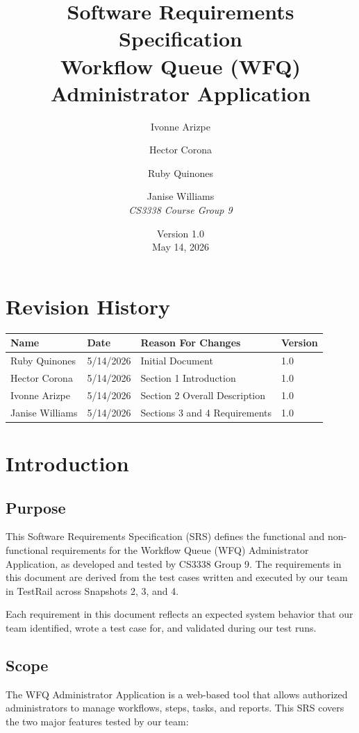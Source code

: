 \documentclass[12pt]{article}
\title{Software Requirements Specification\\
\large Workflow Queue (WFQ) Administrator Application}
\author{Ivonne Arizpe \and Hector Corona \and Ruby Quinones \and Janise Williams\\[0.5em]
\textit{CS3338 Course Group 9}}
\date{Version 1.0 \\ May 14, 2026}
\begin{document}
 
\maketitle
\newpage
\tableofcontents
\newpage
 
\section*{Revision History}
\begin{center}
\begin{tabular}{llll}
\toprule
Name & Date & Reason For Changes & Version \\
\midrule
Ruby Quinones   & 5/14/2026 & Initial Document                    & 1.0 \\
Hector Corona   & 5/14/2026 & Section 1 Introduction              & 1.0 \\
Ivonne Arizpe   & 5/14/2026 & Section 2 Overall Description       & 1.0 \\
Janise Williams & 5/14/2026 & Sections 3 and 4 Requirements       & 1.0 \\
\bottomrule
\end{tabular}
\end{center}
\newpage
 
\section{Introduction}
 
\subsection{Purpose}
This Software Requirements Specification (SRS) defines the functional and non-functional
requirements for the Workflow Queue (WFQ) Administrator Application, as developed and
tested by CS3338 Group 9. The requirements in this document are derived from the test cases
written and executed by our team in TestRail across Snapshots 2, 3, and 4.
 
Each requirement in this document reflects an expected system behavior that our team
identified, wrote a test case for, and validated during our test runs.
 
\subsection{Scope}
The WFQ Administrator Application is a web-based tool that allows authorized administrators
to manage workflows, steps, tasks, and reports. This SRS covers the two major features
tested by our team:
 
\end{document}
